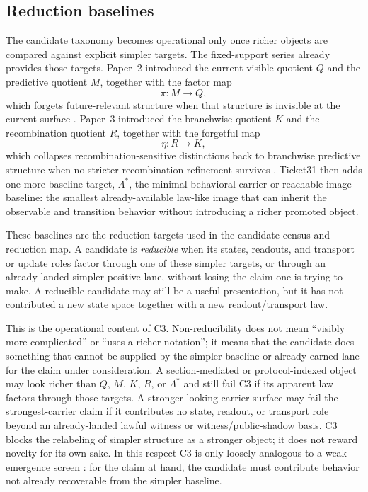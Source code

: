 \documentclass[11pt]{article}
\theoremstyle{definition}
\begin{document}
\subsection{Reduction baselines}

The candidate taxonomy becomes operational only once richer objects are compared against
explicit simpler targets. The fixed-support series already provides those targets. Paper~2
introduced the current-visible quotient $Q$ and the predictive quotient $M$, together
with the factor map
\[
\pi : M \to Q,
\]
which forgets future-relevant structure when that structure is invisible at the current
surface \citep{Tsiokos2026HolonomyMemory}. Paper~3 introduced the branchwise quotient
$K$ and the recombination quotient $R$, together with the forgetful map
\[
\eta : R \to K,
\]
which collapses recombination-sensitive distinctions back to branchwise predictive
structure when no stricter recombination refinement survives
\citep{Tsiokos2026MarkingErasureRecombination}. Ticket31 then adds one more baseline
target, $\Lambda^\ast$, the minimal behavioral carrier or reachable-image baseline: the
smallest already-available law-like image that can inherit the observable and transition
behavior without introducing a richer promoted object.

These baselines are the reduction targets used in the candidate census and reduction
map. A candidate is \emph{reducible} when its states, readouts, and transport or update
roles factor through one of these simpler targets, or through an already-landed simpler
positive lane, without losing the claim one is trying to make. A reducible candidate
may still be a useful presentation, but it has not contributed a new state space
together with a new readout/transport law.

This is the operational content of C3. Non-reducibility does not mean ``visibly more
complicated'' or ``uses a richer notation''; it means that the candidate does something
that cannot be supplied by the simpler baseline or already-earned lane for the claim
under consideration. A section-mediated or protocol-indexed object may look richer than
$Q$, $M$, $K$, $R$, or $\Lambda^\ast$ and still fail C3 if its apparent law factors
through those targets. A stronger-looking carrier surface may fail the strongest-carrier
claim if it contributes no state, readout, or transport role beyond an already-landed
lawful witness or witness/public-shadow basis. C3 blocks the relabeling of simpler
structure as a stronger object; it does not reward novelty for its own sake. In this
respect C3 is only loosely analogous to a weak-emergence screen
\citep{Bedau1997}: for the claim at hand, the candidate must contribute behavior not
already recoverable from the simpler baseline.
\end{document}
